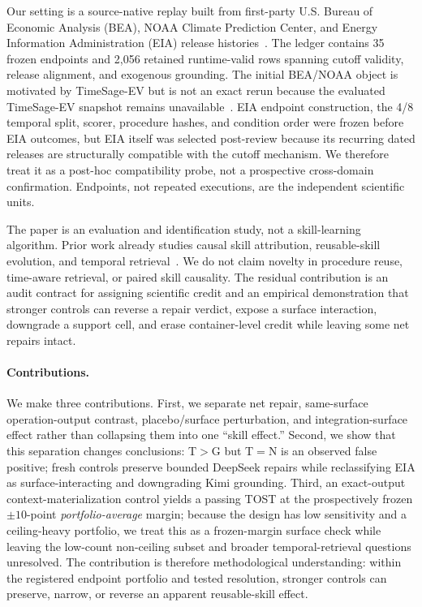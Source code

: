 Our setting is a source-native replay built from first-party U.S. Bureau of Economic Analysis (BEA), NOAA Climate Prediction Center, and Energy Information Administration (EIA) release histories~\citep{bea2026archive,noaa2026enso,eia2026wpsrarchive}. The ledger contains 35 frozen endpoints and 2,056 retained runtime-valid rows spanning cutoff validity, release alignment, and exogenous grounding. The initial BEA/NOAA object is motivated by TimeSage-EV but is not an exact rerun because the evaluated TimeSage-EV snapshot remains unavailable~\citep{yao2026timesage}. EIA endpoint construction, the 4/8 temporal split, scorer, procedure hashes, and condition order were frozen before EIA outcomes, but EIA itself was selected post-review because its recurring dated releases are structurally compatible with the cutoff mechanism. We therefore treat it as a post-hoc compatibility probe, not a prospective cross-domain confirmation. Endpoints, not repeated executions, are the independent scientific units.

The paper is an evaluation and identification study, not a skill-learning algorithm. Prior work already studies causal skill attribution, reusable-skill evolution, and temporal retrieval~\citep{zhou2026counterfactual,dong2026agentskills,wang2026notallskills,guan2026continualskillbench,wei2026evoharness,zheng2026skillprox,xu2026hyperskill,asai2024selfrag,yan2024crag,han2025temporalgraphs,wang2026iarag}. We do not claim novelty in procedure reuse, time-aware retrieval, or paired skill causality. The residual contribution is an audit contract for assigning scientific credit and an empirical demonstration that stronger controls can reverse a repair verdict, expose a surface interaction, downgrade a support cell, and erase container-level credit while leaving some net repairs intact.

\paragraph{Contributions.}
We make three contributions. First, we separate net repair, same-surface operation-output contrast, placebo/surface perturbation, and integration-surface effect rather than collapsing them into one ``skill effect.'' Second, we show that this separation changes conclusions: T$>$G but T$=$N is an observed false positive; fresh controls preserve bounded DeepSeek repairs while reclassifying EIA as surface-interacting and downgrading Kimi grounding. Third, an exact-output context-materialization control yields a passing TOST at the prospectively frozen $\pm10$-point \emph{portfolio-average} margin; because the design has low sensitivity and a ceiling-heavy portfolio, we treat this as a frozen-margin surface check while leaving the low-count non-ceiling subset and broader temporal-retrieval questions unresolved. The contribution is therefore methodological understanding: within the registered endpoint portfolio and tested resolution, stronger controls can preserve, narrow, or reverse an apparent reusable-skill effect.

